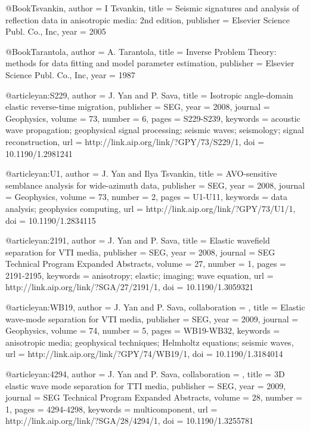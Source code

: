 {@Book{Tsvankin,
  author =	 {I Tsvankin},
  title =	 {Seismic signatures and analysis of reflection data
                  in anisotropic media: 2nd edition},
  publisher =	 {Elsevier Science Publ. Co., Inc},
  year =	 2005
}

@Book{Tarantola,
  author = 	 {A. Tarantola},
  title = 	 {Inverse {P}roblem {T}heory: methods for data
                 fitting and model parameter estimation},
  publisher = 	 {Elsevier Science Publ. Co., Inc},
  year = 	 1987
}

@article{yan:S229,
  author =	 {J. Yan and P. Sava},
  title =	 {Isotropic angle-domain elastic reverse-time
                  migration},
  publisher =	 {SEG},
  year =	 2008,
  journal =	 {Geophysics},
  volume =	 73,
  number =	 6,
  pages =	 {S229-S239},
  keywords =	 {acoustic wave propagation; geophysical signal
                  processing; seismic waves; seismology; signal
                  reconstruction},
  url =		 {http://link.aip.org/link/?GPY/73/S229/1},
  doi =		 {10.1190/1.2981241}
}

@article{yan:U1,
  author =	 {J. Yan and Ilya Tsvankin},
  title =	 {AVO-sensitive semblance analysis for wide-azimuth
                  data},
  publisher =	 {SEG},
  year =	 2008,
  journal =	 {Geophysics},
  volume =	 73,
  number =	 2,
  pages =	 {U1-U11},
  keywords =	 {data analysis; geophysics computing},
  url =		 {http://link.aip.org/link/?GPY/73/U1/1},
  doi =		 {10.1190/1.2834115}
}

@article{yan:2191,
  author =	 {J. Yan and P. Sava},
  title =	 {Elastic wavefield separation for {VTI} media},
  publisher =	 {SEG},
  year =	 2008,
  journal =	 {SEG Technical Program Expanded Abstracts},
  volume =	 27,
  number =	 1,
  pages =	 {2191-2195},
  keywords =	 {anisotropy; elastic; imaging; wave equation},
  url =		 {http://link.aip.org/link/?SGA/27/2191/1},
  doi =		 {10.1190/1.3059321}
}




@article{yan:WB19,
author = {J. Yan and P. Sava},
collaboration = {},
title = {Elastic wave-mode separation for {VTI} media},
publisher = {SEG},
year = {2009},
journal = {Geophysics},
volume = {74},
number = {5},
pages = {WB19-WB32},
keywords = {anisotropic media; geophysical techniques; Helmholtz equations; seismic waves},
url = {http://link.aip.org/link/?GPY/74/WB19/1},
doi = {10.1190/1.3184014}
}




@article{yan:4294,
author = {J. Yan and P. Sava},
collaboration = {},
title = {3{D} elastic wave mode separation for {TTI} media},
publisher = {SEG},
year = {2009},
journal = {SEG Technical Program Expanded Abstracts},
volume = {28},
number = {1},
pages = {4294-4298},
keywords = {multicomponent},
url = {http://link.aip.org/link/?SGA/28/4294/1},
doi = {10.1190/1.3255781}
}







}
